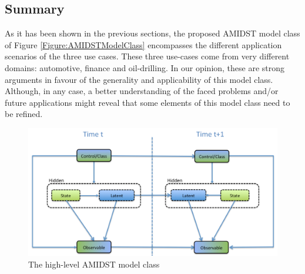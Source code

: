 \subsection{Summary}\label{summaryAMIDSTModels}

As it has been shown in the previous sections, the proposed AMIDST model class of Figure \ref{Figure:AMIDSTModelClass} encompasses the different application scenarios of the three use cases. These three use-cases come from very different domains: automotive, finance and oil-drilling. In our opinion, these are strong arguments in favour of the generality and applicability of this model class. Although, in any case, a better understanding of the faced problems and/or future applications might reveal that some elements of this model class need to be refined.  



\begin{figure}[ht!]
\begin{center}
\includegraphics[scale=0.4]{./figures/AMIDSTModelClassGeneral}
\caption{\label{Figure:AMIDSTModelClassHighLevel} The high-level AMIDST model class}
\end{center}
\end{figure}


 



